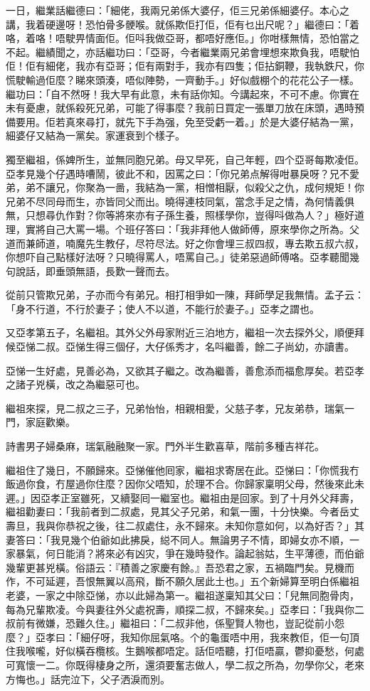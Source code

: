 \documentclass[a5paper, 12pt, openany]{book} %
\begin{document}
	一日，繼業話繼德曰：「細佬，我兩兄弟係大婆仔，佢三兄弟係細婆仔。本心之講，我着硬邊呀！恐怕骨多骾喉。就係欺佢打佢，佢有乜出尺呢？」繼德曰：「着咯，着咯！唔駛畀情面佢。佢呌我做亞哥，都唔好應佢。」你咁樣無情，恐怕當之不起。繼績聞之，亦話繼功曰：「亞哥，今者繼業兩兄弟會埋想來欺負我，唔駛怕佢！佢有細佬，我亦有亞哥；佢有兩對手，我亦有四隻；佢拈銅鞭，我執鉄尺，你慌駛輸過佢麼？睇來頭湊，唔似陣勢，一齊動手。」好似戲棚个的花花公子一樣。繼功曰：「自不然呀！我大早有此意，未有話你知。今講起來，不可不慮。你實在未有憂慮，就係殺死兄弟，可能了得事麼？我前日買定一張單刀放在床頭，遇時預備要用。佢若真來尋打，就先下手為强，免至受虧一着。」於是大婆仔結為一黨，細婆仔又結為一黨矣。家運衰到个樣子。

	獨至繼祖，係婢所生，並無同胞兄弟。母又早死，自己年輕，四个亞哥每欺凌佢。亞孝見幾个仔遇時嘈鬧，彼此不和，因罵之曰：「你兄弟点解得咁暴戾呀？兄不愛弟，弟不讓兄，你聚為一啚，我結為一黨，相憎相厭，似殺父之仇，成何規矩！你兄弟不尽同母而生，亦皆同父而出。曉得連枝同氣，當念手足之情，為何情義俱無，只想尋仇作對？你等將來亦有子孫生養，照樣學你，豈得呌做為人？」極好道理，實將自己大罵一場。个班仔答曰：「我非拜他人做師傅，原來學你之所為。父道而兼師道，喃魔先生教仔，尽符尽法。好之你會埋三叔四叔，專去欺五叔六叔，你想吓自己點樣好法呀？只曉得罵人，唔罵自己。」徒弟惡過師傅咯。亞孝聽聞幾句說話，即垂頭無語，長歎一聲而去。

	從前只管欺兄弟，子亦而今有弟兄。相打相爭如一陳，拜師學足我無情。孟子云：「身不行道，不行於妻子；使人不以道，不能行於妻子。」亞孝之謂也。

	又亞孝第五子，名繼祖。其外父外母家附近三泊地方，繼祖一次去探外父，順便拜候亞悌二叔。亞悌生得三個仔，大仔係秀才，名呌繼善，餘二子尚幼，亦讀書。

	亞悌一生好處，見善必為，又欲其子繼之。改為繼善，善愈添而福愈厚矣。若亞孝之諸子兇橫，改之為繼惡可也。

	繼祖來探，見二叔之三子，兄弟怡怡，相親相愛，父慈子孝，兄友弟恭，瑞氣一門，家庭歡樂。

	詩書男子婦桑麻，瑞氣融融聚一家。門外半生歡喜草，階前多種吉祥花。

	繼祖住了幾日，不願歸來。亞悌催他囘家，繼祖求寄居在此。亞悌曰：「你慌我冇飯過你食，冇屋過你住麼？因你父唔知，於理不合。你歸家稟明父母，然後來此未遲。」因亞孝正室雖死，又續娶囘一繼室也。繼祖由是回家。到了十月外父拜壽，繼祖勸妻曰：「我前者到二叔處，見其父子兄弟，和氣一團，十分快樂。今者岳丈壽旦，我與你恭祝之後，往二叔處住，永不歸來。未知你意如何，以為好否？」其妻答曰：「我見幾个伯爺如此拂戾，縂不同人。無論男子不情，即婦女亦不順，一家暴氣，何日能消？將來必有凶灾，爭在幾時發作。論起翁姑，生平薄德，而伯爺幾輩更甚兇橫。俗語云：『積善之家慶有餘。』吾恐君之家，五禍臨門矣。見機而作，不可延遲，吾恨無翼以高飛，斷不願久居此土也。」五个新婦算至明白係繼祖老婆，一家之中除亞悌，亦以此婦為第一。繼祖遂稟知其父曰：「兒無同胞骨肉，每為兄輩欺凌。今與妻往外父處祝壽，順探二叔，不歸來矣。」亞孝曰：「我與你二叔前有微嫌，恐難久住。」繼祖曰：「二叔非他，係聖賢人物也，豈記從前小怨麼？」亞孝曰：「細仔呀，我知你屈氣咯。个的龜蛋唔中用，我來教佢，佢一句頂住我喉嚨，好似橫吞欖核。生鵝喉都唔定。話佢唔聽，打佢唔贏，鬱抑憂愁，何處可寬懷一二。你既得棲身之所，還須要奮志做人，學二叔之所為，勿學你父，老來方悔也。」話完泣下，父子洒淚而別。
\end{document}
